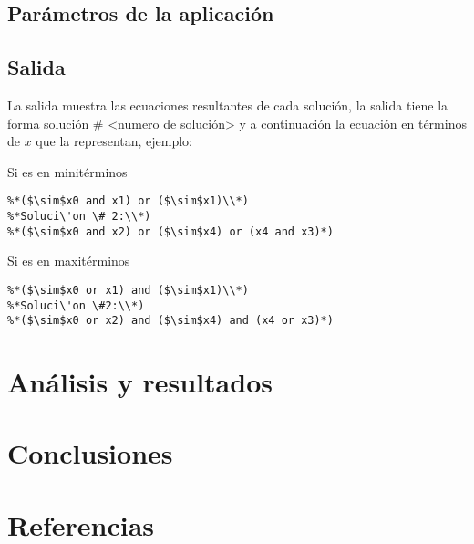\documentclass[a4paper]{article}
\begin{document}
\subsection{Parámetros de la aplicación}

\subsection{Salida}

La salida muestra las ecuaciones resultantes de cada solución, la salida tiene la forma solución \# <numero de solución> y a continuación la ecuación en términos de $x$ que la representan, ejemplo:

Si es en minitérminos
\lstset{frameround=fttt}
\begin{lstlisting}[frame=trBL]
%*Soluci\'on \# 1:\\*)
%*($\sim$x0 and x1) or ($\sim$x1)\\*)
%*Soluci\'on \# 2:\\*)
%*($\sim$x0 and x2) or ($\sim$x4) or (x4 and x3)*)
\end{lstlisting}

Si es en maxitérminos
\lstset{frameround=fttt}
\begin{lstlisting}[frame=trBL]
%*Soluci\'{o}n \#1:\\*)
%*($\sim$x0 or x1) and ($\sim$x1)\\*)
%*Soluci\'on \#2:\\*)
%*($\sim$x0 or x2) and ($\sim$x4) and (x4 or x3)*)
\end{lstlisting}

\section{Análisis y resultados}

\section{Conclusiones}

\section{Referencias}
\end{document}
